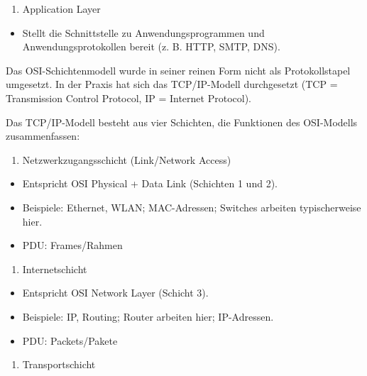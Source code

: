 \documentclass[
  nswissgerman,
  a4paper,
  DIV=11,
  numbers=noendperiod,
  ngerman]{scrreprt}
\providecommand{\tightlist}{%
  \setlength{\itemsep}{0pt}\setlength{\parskip}{0pt}}
\begin{document}
\begin{enumerate}
\def\labelenumi{\arabic{enumi})}
\setcounter{enumi}{6}
\tightlist
\item
  Application Layer
\end{enumerate}

\begin{itemize}
\tightlist
\item
  Stellt die Schnittstelle zu Anwendungsprogrammen und
  Anwendungsprotokollen bereit (z. B. HTTP, SMTP, DNS).
\end{itemize}

Das OSI-Schichtenmodell wurde in seiner reinen Form nicht als
Protokollstapel umgesetzt. In der Praxis hat sich das TCP/IP-Modell
durchgesetzt (TCP = Transmission Control Protocol, IP = Internet
Protocol).

Das TCP/IP-Modell besteht aus vier Schichten, die Funktionen des
OSI-Modells zusammenfassen:

\begin{enumerate}
\def\labelenumi{\arabic{enumi})}
\tightlist
\item
  Netzwerkzugangsschicht (Link/Network Access)
\end{enumerate}

\begin{itemize}
\tightlist
\item
  Entspricht OSI Physical + Data Link (Schichten 1 und 2).
\item
  Beispiele: Ethernet, WLAN; MAC-Adressen; Switches arbeiten
  typischerweise hier.
\item
  PDU: Frames/Rahmen
\end{itemize}

\begin{enumerate}
\def\labelenumi{\arabic{enumi})}
\setcounter{enumi}{1}
\tightlist
\item
  Internetschicht
\end{enumerate}

\begin{itemize}
\tightlist
\item
  Entspricht OSI Network Layer (Schicht 3).
\item
  Beispiele: IP, Routing; Router arbeiten hier; IP-Adressen.
\item
  PDU: Packets/Pakete
\end{itemize}

\begin{enumerate}
\def\labelenumi{\arabic{enumi})}
\setcounter{enumi}{2}
\tightlist
\item
  Transportschicht
\end{enumerate}
\end{document}
